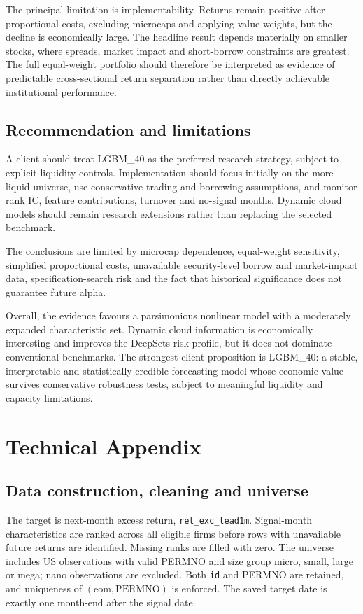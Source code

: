 \documentclass[11pt,a4paper]{article}
\begin{document}
The principal limitation is implementability. Returns remain positive after proportional costs, excluding microcaps and applying value weights, but the decline is economically large. The headline result depends materially on smaller stocks, where spreads, market impact and short-borrow constraints are greatest. The full equal-weight portfolio should therefore be interpreted as evidence of predictable cross-sectional return separation rather than directly achievable institutional performance.

\subsection*{Recommendation and limitations}

A client should treat LGBM\_40 as the preferred research strategy, subject to explicit liquidity controls. Implementation should focus initially on the more liquid universe, use conservative trading and borrowing assumptions, and monitor rank IC, feature contributions, turnover and no-signal months. Dynamic cloud models should remain research extensions rather than replacing the selected benchmark.

The conclusions are limited by microcap dependence, equal-weight sensitivity, simplified proportional costs, unavailable security-level borrow and market-impact data, specification-search risk and the fact that historical significance does not guarantee future alpha.

Overall, the evidence favours a parsimonious nonlinear model with a moderately expanded characteristic set. Dynamic cloud information is economically interesting and improves the DeepSets risk profile, but it does not dominate conventional benchmarks. The strongest client proposition is LGBM\_40: a stable, interpretable and statistically credible forecasting model whose economic value survives conservative robustness tests, subject to meaningful liquidity and capacity limitations.

\clearpage
\appendix
\section{Technical Appendix}

\subsection{Data construction, cleaning and universe}
The target is next-month excess return, \texttt{ret\_exc\_lead1m}. Signal-month characteristics are ranked across all eligible firms before rows with unavailable future returns are identified. Missing ranks are filled with zero. The universe includes US observations with valid PERMNO and size group micro, small, large or mega; nano observations are excluded. Both \texttt{id} and PERMNO are retained, and uniqueness of $(\text{eom},\text{PERMNO})$ is enforced. The saved target date is exactly one month-end after the signal date.
\end{document}
